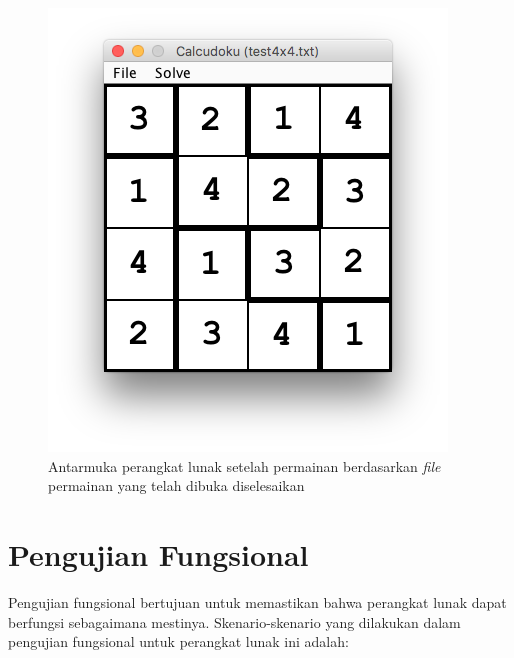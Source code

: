 \begin{figure}
\centering
\captionsetup{justification=centering}
\includegraphics[scale=0.5]{Gambar/ImplementasiPengujian/Calcudoku3.png}
\caption[Antarmuka perangkat lunak setelah permainan berdasarkan \textit{file} permainan yang telah dibuka diselesaikan]{Antarmuka perangkat lunak setelah permainan berdasarkan \textit{file} permainan yang telah dibuka diselesaikan}
\label{fig:antarmukapl5}
\end{figure}

\clearpage

\section{Pengujian Fungsional}
\label{sec:pengujianfungsional}

Pengujian fungsional bertujuan untuk memastikan bahwa perangkat lunak dapat berfungsi sebagaimana mestinya. Skenario-skenario yang dilakukan dalam pengujian fungsional untuk perangkat lunak ini adalah:

